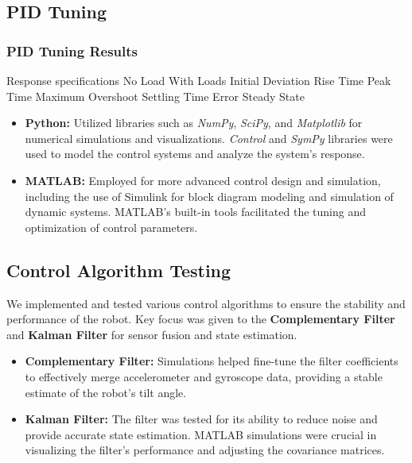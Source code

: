 \subsection{PID Tuning}
\subsubsection{}
\subsubsection{PID Tuning Results}
Response specifications No Load With Loads 
Initial Deviation 
Rise Time
Peak Time
Maximum Overshoot
Settling Time
Error Steady State

\begin{itemize}
\item \textbf{Python:} Utilized libraries such as \textit{NumPy}, \textit{SciPy}, and \textit{Matplotlib} for numerical simulations and visualizations. \textit{Control} and \textit{SymPy} libraries were used to model the control systems and analyze the system's response.
\item \textbf{MATLAB:} Employed for more advanced control design and simulation, including the use of Simulink for block diagram modeling and simulation of dynamic systems. MATLAB's built-in tools facilitated the tuning and optimization of control parameters.
\end{itemize}

\subsection{Control Algorithm Testing}
We implemented and tested various control algorithms to ensure the stability and performance of the robot. Key focus was given to the \textbf{Complementary Filter} and \textbf{Kalman Filter} for sensor fusion and state estimation.

\begin{itemize}
\item \textbf{Complementary Filter:} Simulations helped fine-tune the filter coefficients to effectively merge accelerometer and gyroscope data, providing a stable estimate of the robot's tilt angle.
\item \textbf{Kalman Filter:} The filter was tested for its ability to reduce noise and provide accurate state estimation. MATLAB simulations were crucial in visualizing the filter's performance and adjusting the covariance matrices.
\end{itemize}

